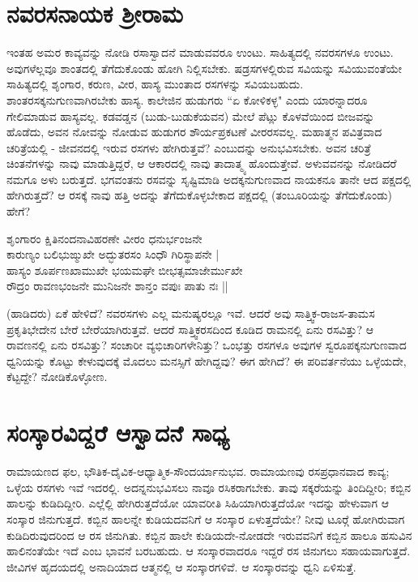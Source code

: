 \section*{ನವರಸನಾಯಕ ಶ್ರೀರಾಮ} 

ಇಂತಹ ಅಮರ ಕಾವ್ಯವನ್ನು ನೋಡಿ ರಸಾಸ್ವಾದನೆ ಮಾಡುವವರೂ ಉಂಟು. ಸಾಹಿತ್ಯದಲ್ಲಿ ನವರಸಗಳೂ ಉಂಟು. ಅವುಗಳೆಲ್ಲವೂ ಶಾಂತದಲ್ಲಿ ತೆಗೆದುಕೊಂಡು ಹೋಗಿ ನಿಲ್ಲಿಸಬೇಕು. ಷಡ್ರಸಗಳಲ್ಲಿರುವ ಸವಿಯನ್ನು ಸವಿಯುವಂತೆಯೇ ಸಾಹಿತ್ಯದಲ್ಲಿ ಶೃಂಗಾರ, ಕರುಣ, ವೀರ, ಹಾಸ್ಯ ಮುಂತಾದ ರಸಗಳನ್ನು ಸವಿಯಬಹುದು. ಶಾಂತರಸಕ್ಕನುಗುಣವಾಗಿರಬೇಕು ಹಾಸ್ಯ. ಕಾಲೇಜಿನ ಹುಡುಗರು ``ಏ ಕೋಳಿಕಳ್ಳ" ಎಂದು ಯಾರನ್ನಾದರೂ ಗೇಲಿಮಾಡುವ ಹಾಸ್ಯವಲ್ಲ. ಕಡವಡ್ಡನ (ಬುಡು-ಬುಡುಕೆಯವನ) ಮೇಲೆ ಪೆಟ್ಲು ಕೊಳವೆಯಿಂದ ಬೀಜವನ್ನು ಹೊಡೆದು, ಅವನ ನೋವನ್ನು ನೋಡುವ ಹುಡುಗರ ಶೌರ್ಯಪ್ರಕಟಣೆ ವೀರರಸವಲ್ಲ. ಮಹಾತ್ಮನ ಪವಿತ್ರವಾದ ಚರಿತ್ರೆಯಲ್ಲಿ - ಜೀವನದಲ್ಲಿ ಇರುವ ರಸಗಳು ಹೇಗಿರುತ್ತವೆ? ಎಂಬುದನ್ನು ಅನುಭವಿಸಬೇಕು. ಅವನ ಚರಿತ್ರೆ ಚಿಂತನೆಗಳನ್ನು ನಾವು ಮಾಡುತ್ತಿದ್ದರೆ, ಆ ಆಕಾರದಲ್ಲಿ ನಾವು ತಾದಾತ್ಮ್ಯ ಹೊಂದುತ್ತೇವೆ. ಅಳುವವನನ್ನು ನೋಡಿದರೆ ನಮಗೂ ಅಳು ಬರುತ್ತದೆ. ಭಗವಂತನು ರಸವನ್ನು ಸೃಷ್ಟಿಮಾಡಿ ಅದಕ್ಕನುಗುಣವಾದ ನಾಯಕನೂ ತಾನೇ ಆದ ಪಕ್ಷದಲ್ಲಿ ಹೇಗಿರುತ್ತದೆ? ಆ ರಸಕ್ಕೆ ನಾವು ಹತ್ತಿ ಅದನ್ನು ತೆಗೆದುಕೊಳ್ಳಬೇಕಾದ ಪಕ್ಷದಲ್ಲಿ (ತಂಬೂರಿಯನ್ನು ತೆಗೆದುಕೊಂಡು) ಹೇಗೆ? 

\begin{shloka}
ಶೃಂಗಾರಂ ಕ್ಷಿತಿನಂದನಾವಿಹರಣೇ ವೀರಂ ಧನುರ್ಭಂಜನೇ\label{182a}\\ 
ಕಾರುಣ್ಯಂ ಬಲಿಭುಙ್ಮುಖೇ ಅದ್ಭುತರಸಂ ಸಿಂಧೌ ಗಿರಿಸ್ಥಾಪನೇ |\\ 
ಹಾಸ್ಯಂ ಶೂರ್ಪಣಖಾಮುಖೇ ಭಯಮಘೇ ಬೀಭತ್ಸಮಾಜೇರ್ಮುಖೇ\\ 
ರೌದ್ರಂ ರಾವಣಭಂಜನೇ ಮುನಿಜನೇ ಶಾನ್ತಂ ವಪುಃ ಪಾತು ನಃ || 
\end{shloka}

(ಹಾಡಿದರು) ಏಕೆ ಹೇಳಿದೆ? ನವರಸಗಳು ಎಲ್ಲ ಮನುಷ್ಯರಲ್ಲೂ ಇವೆ. ಆದರೆ ಅವು ಸಾತ್ತ್ವಿಕ-ರಾಜಸ-ತಾಮಸ ಪ್ರಕೃತಿಭೇದೇನ ಬೇರೆ ಬೇರೆಯಾಗಿರುತ್ತವೆ. ಆದರೆ ಸಾತ್ತ್ವಿಕರಸದಿಂದ ಕೂಡಿದ ರಾಮನಲ್ಲಿ ಏನು ರಸವಿತ್ತು? ಆ ರಾವಣನಲ್ಲಿ ಏನು ರಸವಿತ್ತು? ಸಂಚಾರೀ ವ್ಯಭಿಚಾರಿಗಳೇನಿತ್ತು? ಒಂಭತ್ತು ರಸಗಳೂ ಅವುಗಳ ಸ್ವರೂಪಕ್ಕನುಗುಣವಾದ ಧ್ವನಿಯನ್ನು ಕೊಟ್ಟು ಕೇಳುವುದಕ್ಕೆ ಮೊದಲು ಮನಸ್ಸಿಗೆ  ಹೇಗಿದ್ದವು? ಈಗ ಹೇಗಿದೆ? ಈ ಪರಿವರ್ತನೆಯು ಒಳ್ಳೆಯದೇ, ಕೆಟ್ಟದ್ದೇ? ನೋಡಿಕೊಳ್ಳೋಣ. 

\section*{ಸಂಸ್ಕಾರವಿದ್ದರೆ ಆಸ್ವಾದನೆ ಸಾಧ್ಯ} 

ರಾಮಾಯಣದ ಫಲ, ಭೌತಿಕ-ದೈವಿಕ-ಆಧ್ಯಾತ್ಮಿಕ-ಸೌಂದರ್ಯಾನುಭವ. ರಾಮಾಯಣವು ರಸಪ್ರಧಾನವಾದ ಕಾವ್ಯ; ಒಳ್ಳೆಯ ರಸಗಳು ಇವೆ ಇದರಲ್ಲಿ. ಅದನ್ನನುಭವಿಸಲು ನಾವೂ ರಸಿಕರಾಗಬೇಕು. ತಾವು ಸಕ್ಕರೆಯನ್ನು ತಿಂದಿದ್ದೀರಿ; ಕಬ್ಬಿನ ಹಾಲನ್ನು ಕುಡಿದಿದ್ದೀರಿ. ಎಲ್ಲೆಲ್ಲಿ ಹೇಗಿರುತ್ತದೆಯೋ ಯಾವರೀತಿ ಸಿಹಿಯಾಗಿರುತ್ತದೆಯೋ ಇದನ್ನು ಹೇಳುವಾಗ ಆ ಸಂಸ್ಕಾರ ಜಿನುಗುತ್ತದೆ. ಕಬ್ಬಿನ ಹಾಲನ್ನೇ ಕುಡಿಯದವನಿಗೆ ಆ ಸಂಸ್ಕಾರ ಏಳುತ್ತದೆಯೇ? ನೀವು ಟೂರ್‍ಗೆ ಹೋಗಿರುವಾಗ ಕುಡಿದಿರುವುದರಿಂದ ಆ ರಸ ಜಿನುಗಿತು. ಕಬ್ಬಿನ ಹಾಲೇ ಕುಡಿಯದೇ-ನೋಡದೇ ಇರುವವನಿಗೆ ಕಬ್ಬಿನ ಹಾಲೂ ಹಸುವಿನ ಹಾಲಿನಂತೆಯೇ ಇದೆ ಎಂಬ ಭಾವನೆ ಬರಬಹುದು. ಆ ಸಂಸ್ಕಾರವಾದರೂ ಇದ್ದರೆ ರಸ ಜಿನುಗಲು ಸಹಾಯವಾಗುತ್ತದೆ. ಜೀವಿಗಳ ಹೃದಯದಲ್ಲಿ ಅನಾದಿಯಾದ ಆತ್ಮನಲ್ಲಿ ಆ ಸಂಸ್ಕಾರಗಳಿವೆ. ಆ ಸಂಸ್ಕಾರವನ್ನು ಧ್ವನಿ ಏಳಿಸುತ್ತೆ. 

